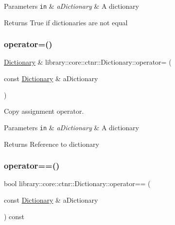 \begin{DoxyParams}[1]{Parameters}
\mbox{\tt in}  & {\em a\+Dictionary} & A dictionary \\
\hline
\end{DoxyParams}
\begin{DoxyReturn}{Returns}
True if dictionaries are not equal 
\end{DoxyReturn}
\mbox{\label{classlibrary_1_1core_1_1ctnr_1_1_dictionary_a777e326af296dd48c1e3fcc51d378f58}} 
\subsubsection{\texorpdfstring{operator=()}{operator=()}}
{\footnotesize\ttfamily \hyperlink{classlibrary_1_1core_1_1ctnr_1_1_dictionary}{Dictionary} \& library\+::core\+::ctnr\+::\+Dictionary\+::operator= (\begin{DoxyParamCaption}\item[{const \hyperlink{classlibrary_1_1core_1_1ctnr_1_1_dictionary}{Dictionary} \&}]{a\+Dictionary }\end{DoxyParamCaption})}



Copy assignment operator. 


\begin{DoxyParams}[1]{Parameters}
\mbox{\tt in}  & {\em a\+Dictionary} & A dictionary \\
\hline
\end{DoxyParams}
\begin{DoxyReturn}{Returns}
Reference to dictionary 
\end{DoxyReturn}
\mbox{\label{classlibrary_1_1core_1_1ctnr_1_1_dictionary_ab4d5377a537b57f061a2a56e9bd86b47}} 
\subsubsection{\texorpdfstring{operator==()}{operator==()}}
{\footnotesize\ttfamily bool library\+::core\+::ctnr\+::\+Dictionary\+::operator== (\begin{DoxyParamCaption}\item[{const \hyperlink{classlibrary_1_1core_1_1ctnr_1_1_dictionary}{Dictionary} \&}]{a\+Dictionary }\end{DoxyParamCaption}) const}



